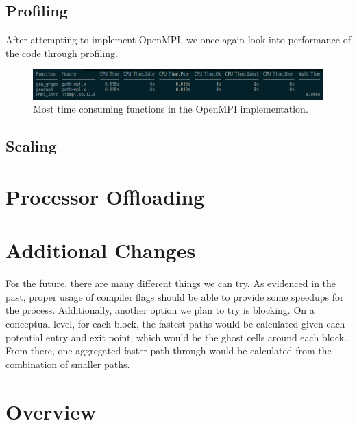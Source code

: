 \documentclass{article}
\begin{document}
\subsection{Profiling}
After attempting to implement OpenMPI, we once again look into performance of the code through profiling. 
	\begin{figure}[h!]
		\begin{center}
			\includegraphics[width=0.7\columnwidth]{amplxe_mpi}
			\caption{Most time consuming functions in the OpenMPI implementation.}
			\label{amplxe_mpi}
		\end{center}
	\end{figure}

\subsection{Scaling}

\section{Processor Offloading}

\section{Additional Changes}
For the future, there are many different things we can try. As evidenced in the past, proper usage of compiler flags should be able to provide some speedups for the process. Additionally, another option we plan to try is blocking. On a conceptual level, for each block, the fastest paths would be calculated given each potential entry and exit point, which would be the ghost cells around each block. From there, one aggregated faster path through would be calculated from the combination of smaller paths. 

\section{Overview}

\begin{thebibliography}{1}

\end{thebibliography}
\end{document}

